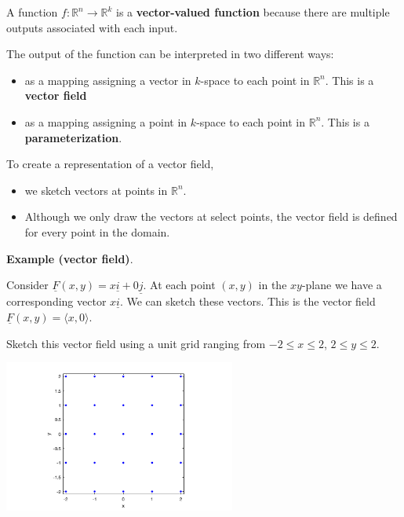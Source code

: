 \documentclass[12pt,letterpaper,noanswers]{exam}
\newcommand{\mb}[1]{\underline{#1}}
\begin{document}
\begin{tcolorbox}
 A function $f: \mathbb{R}^n \rightarrow \mathbb{R}^k$ is a \textbf{vector-valued function} because there are multiple outputs associated with each input.  
    
    The output of the function can be interpreted in two different ways: 
    \begin{itemize} 
    \itemsep0em
    \item as a mapping assigning a vector in $k$-space to each point in $\mathbb{R}^n$.  This is a \textbf{vector field}
    \item as a mapping assigning a point in $k$-space to each point in $\mathbb{R}^n$.  This is a \textbf{parameterization}.
    \end{itemize}
    
To create a representation of a vector field, 
\begin{itemize}
    \itemsep0em
\item we sketch vectors at points in $\mathbb{R}^n$.  
\item Although we only draw the vectors at select points, the
vector field is defined for every point in the domain. \\
\end{itemize}
\end{tcolorbox}



\noindent\textbf{Example (vector field)}.  
\begin{multicols}{2}
Consider
$\mb F(x,y) = x\mb i + 0 \mb j.$  At each point $(x,y)$ in the $xy$-plane we have a corresponding vector $x\mb i$.  We can sketch these vectors.  This is the vector field $\mb F(x,y) = \langle x,0\rangle$.



Sketch this vector field using a unit grid ranging from $-2\leq x \leq 2$, $2\leq y\leq 2$.

\includegraphics[width=3in]{img/C17grid.png}
\end{multicols}
\end{document}
